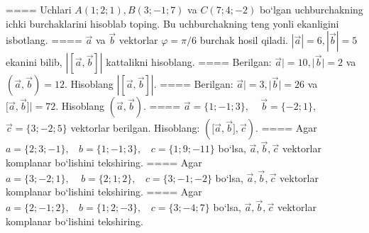 ====
Uchlari $A (1;2;1), B (3;-1;7) $ va $C (7;4;-2) $ bo‘lgan uchburchakning
ichki burchaklarini hisoblab toping. Bu uchburchakning teng yonli ekanligini isbotlang.
====
$\overrightarrow{a}$ va $\overrightarrow{b}$ vektorlar
$\varphi = \pi/6$ burchak hosil qiladi.
$|\overrightarrow{a}| = 6,|\overrightarrow{b}| = 5$ ekanini bilib,
$\left| \left\lbrack \overrightarrow{a},\overrightarrow{b} \right\rbrack \right|$ kattalikni hisoblang.
====
Berilgan: $\overrightarrow{a}| = 10,|\overrightarrow{b}| = 2$ va
$\left(\overrightarrow{a},\overrightarrow{b} \right) = 12$. Hisoblang
$\left| \left\lbrack \overrightarrow{a},\overrightarrow{b} \right\rbrack \right|$.
====
Berilgan: $\overrightarrow{a}| = 3,|\overrightarrow{b}| = 26$ va
$\lbrack\overrightarrow{a},\overrightarrow{b}\rbrack| = 72$. Hisoblang
$\left(\overrightarrow{a},\overrightarrow{b} \right) $.
====
$\overrightarrow{a}
= \{ 1; - 1;3\}, \ \ \ \ \ \overrightarrow{b} = \{ - 2;1\}$, $\overrightarrow{c} = \{3; -2;5\}$ vektorlar berilgan. Hisoblang:
$ (\lbrack\overrightarrow{a},\overrightarrow{b}\rbrack,\overrightarrow{c}) $.
====
Agar \(a = \{ 2;3; - 1\}, \ \ \ \ b = \{ 1; - 1;3\}, \ \ \ \ c = \{ 1;9; - 11\}\) bo‘lsa, $\overrightarrow{a}, \overrightarrow{b}, \overrightarrow{c}$ vektorlar komplanar bo‘lishini tekshiring.
====
Agar \(a = \{ 3; - 2;1\},\ \ \ \ \ b = \{ 2;1;2\},\ \ \ \ c = \{ 3; - 1; - 2\}\) bo‘lsa, $\overrightarrow{a}, \overrightarrow{b}, \overrightarrow{c}$ vektorlar komplanar bo‘lishini tekshiring.
====
Agar \(a = \{ 2; - 1;2\}, \ \ \ \ b = \{ 1;2; - 3\}, \ \ \ \ c = \{ 3; - 4;7\}\) bo‘lsa, $\overrightarrow{a}, \overrightarrow{b}, \overrightarrow{c}$ vektorlar komplanar bo‘lishini tekshiring.